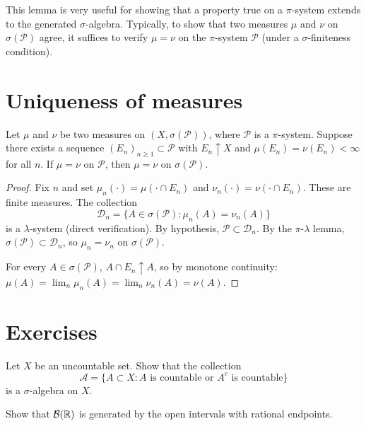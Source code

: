 \begin{warning}[title=\textbf{Using the $\pi$-$\lambda$ lemma}]
This lemma is very useful for showing that a property true on a $\pi$-system extends
to the generated $\sigma$-algebra. Typically, to show that two measures $\mu$ and
$\nu$ on $\sigma(\mathcal{P})$ agree, it suffices to verify $\mu = \nu$ on the
$\pi$-system $\mathcal{P}$ (under a $\sigma$-finiteness condition).
\end{warning}

\section{Uniqueness of measures}

\begin{theorem}
\label{thm:uniqueness_measures}
Let $\mu$ and $\nu$ be two measures on $(X, \sigma(\mathcal{P}))$, where
$\mathcal{P}$ is a $\pi$-system. Suppose there exists a sequence
$(E_n)_{n \geq 1} \subset \mathcal{P}$ with $E_n \uparrow X$ and
$\mu(E_n) = \nu(E_n) < \infty$ for all $n$. If $\mu = \nu$ on $\mathcal{P}$,
then $\mu = \nu$ on $\sigma(\mathcal{P})$.
\end{theorem}

\begin{proof}
Fix $n$ and set $\mu_n(\cdot) = \mu(\cdot \cap E_n)$ and
$\nu_n(\cdot) = \nu(\cdot \cap E_n)$. These are finite measures. The collection
\[
\mathcal{D}_n = \{A \in \sigma(\mathcal{P}) : \mu_n(A) = \nu_n(A)\}
\]
is a $\lambda$-system (direct verification). By hypothesis,
$\mathcal{P} \subset \mathcal{D}_n$. By the $\pi$-$\lambda$ lemma,
$\sigma(\mathcal{P}) \subset \mathcal{D}_n$, so $\mu_n = \nu_n$ on
$\sigma(\mathcal{P})$.

For every $A \in \sigma(\mathcal{P})$, $A \cap E_n \uparrow A$, so by monotone
continuity:
$\mu(A) = \lim_n \mu_n(A) = \lim_n \nu_n(A) = \nu(A)$.
\end{proof}

\section{Exercises}

\begin{exercise}
Let $X$ be an uncountable set. Show that the collection
\[
\mathcal{A} = \{A \subset X : A \text{ is countable or } A^c \text{ is countable}\}
\]
is a $\sigma$-algebra on $X$.
\end{exercise}

\begin{exercise}
Show that $\mathcal{B}(\mathbb{R})$ is generated by the open intervals with rational
endpoints.
\end{exercise}

